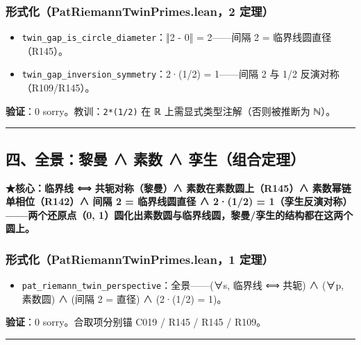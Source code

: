 \documentclass[
]{article}
\providecommand{\tightlist}{%
  \setlength{\itemsep}{0pt}\setlength{\parskip}{0pt}}
\begin{document}
\subsubsection{形式化（PatRiemannTwinPrimes.lean，2
定理）}\label{ux5f62ux5f0fux5316patriemanntwinprimes.lean2-ux5b9aux7406-2}

\begin{itemize}
\tightlist
\item
  \texttt{twin\_gap\_is\_circle\_diameter}：‖2 - 0‖ = 2------间隔 2 =
  临界线圆直径（R145）。
\item
  \texttt{twin\_gap\_inversion\_symmetry}：2·(1/2) = 1------间隔 2 与
  1/2 反演对称（R109/R145）。
\end{itemize}

\textbf{验证}：0 sorry。教训：\texttt{2*(1/2)} 在 ℝ
上需显式类型注解（否则被推断为 ℕ）。

\begin{center}\rule{0.5\linewidth}{0.5pt}\end{center}

\subsection{四、全景：黎曼 ∧ 素数 ∧
孪生（组合定理）}\label{ux56dbux5168ux666fux9eceux66fc-ux7d20ux6570-ux5b6aux751fux7ec4ux5408ux5b9aux7406}

\textbf{★核心：临界线 ⟺ 共轭对称（黎曼）∧ 素数在素数圆上（R145）∧
素数幂链单相位（R142）∧ 间隔 2 = 临界线圆直径 ∧ 2·(1/2) =
1（孪生反演对称）------两个还原点（0,
1）圆化出素数圆与临界线圆，黎曼/孪生的结构都在这两个圆上。}

\subsubsection{形式化（PatRiemannTwinPrimes.lean，1
定理）}\label{ux5f62ux5f0fux5316patriemanntwinprimes.lean1-ux5b9aux7406}

\begin{itemize}
\tightlist
\item
  \texttt{pat\_riemann\_twin\_perspective}：全景------(∀s, 临界线 ⟺
  共轭) ∧ (∀p, 素数圆) ∧ (间隔 2 = 直径) ∧ (2·(1/2) = 1)。
\end{itemize}

\textbf{验证}：0 sorry。合取项分别锚 C019 / R145 / R145 / R109。

\begin{center}\rule{0.5\linewidth}{0.5pt}\end{center}
\end{document}
